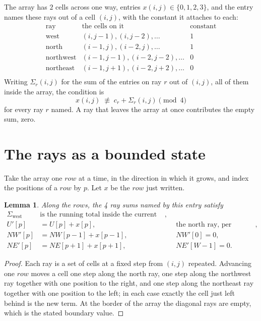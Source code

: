 \documentclass[11pt,a4paper]{article}
\theoremstyle{plain}
\newtheorem{lemma}[theorem]{Lemma}
\theoremstyle{definition}
\begin{document}
The array has $2$ cells across one way, entries $x(i,j)\in\{0,1,2,3\}$, and the entry names these
rays out of a cell $(i,j)$, with the constant it attaches to each:
\[
\begin{array}{lll}
\text{ray} & \text{the cells on it} & \text{constant} \\[2pt]
\text{west} & (i,j-1),(i,j-2),\dots & 1 \\
\text{north} & (i-1,j),(i-2,j),\dots & 1 \\
\text{northwest} & (i-1,j-1),(i-2,j-2),\dots & 0 \\
\text{northeast} & (i-1,j+1),(i-2,j+2),\dots & 0 \\
\end{array}
\]
Writing $\Sigma_r(i,j)$ for the sum of the entries on ray $r$ out of $(i,j)$, all of them
inside the array, the condition is
\[
x(i,j)\;\not\equiv\;c_r+\Sigma_r(i,j) \pmod{4}
\]
for every ray $r$ named. A ray that leaves the array at once contributes the empty sum,
zero.

\section{The rays as a bounded state}

Take the array one $row$ at a time, in the direction in which it grows, and index the
positions of a $row $ by $p$. Let $x$ be the $row$ just written.

\begin{lemma}\label{lem:rays}
Along the $row$s, the 4 ray sums named by this entry satisfy
\[
\begin{aligned}
\Sigma_{\mathrm{west}}\ &\text{is the running total inside the current row},\\
U'[p]&=U[p]+x[p], &&\text{the north ray, per position},\\
NW'[p]&=NW[p-1]+x[p-1], && NW'[0]=0,\\
NE'[p]&=NE[p+1]+x[p+1], && NE'[W-1]=0 .
\end{aligned}
\]
\end{lemma}

\begin{proof}
Each ray is a set of cells at a fixed step from $(i,j)$ repeated. Advancing one $row$
moves a cell one step along the north ray, one step along the northwest ray together with one
position to the right, and one step along the northeast ray together with one position to the
left; in each case exactly the cell just left behind is the new term. At the border of the
array the diagonal rays are empty, which is the stated boundary value.
\end{proof}
\end{document}
